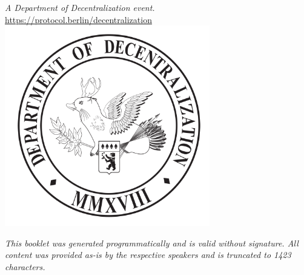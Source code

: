 \newpage
\thispagestyle{plain}
\mbox{}
\newpage
\begin{center}
  \thispagestyle{empty}
  \noindent
  \textit{\small A Department of Decentralization event.}\\
  \underline{\small https://protocol.berlin/decentralization}\\[3em]

  \includegraphics[width=0.67\textwidth]{wolpy.pdf}\\[1em]

  \vspace{\fill}

  \noindent\textit{\small This booklet was generated programmatically and is valid
  without signature. All content was provided as-is by the respective speakers
  and is truncated to 1423 characters.}
\end{center}
